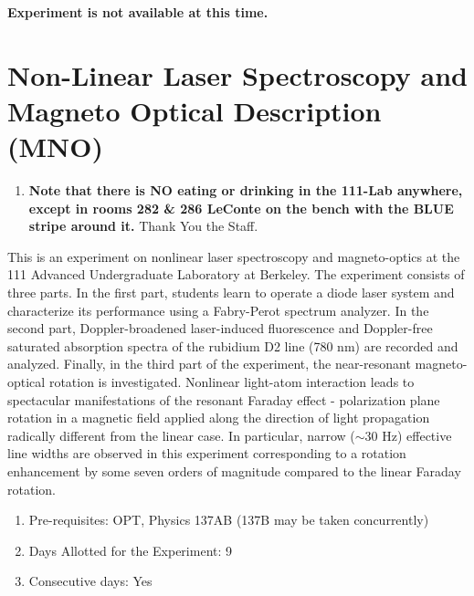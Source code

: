 \documentclass{../lab}
\begin{document}
\maketitle

\vspace{3cm}
\centerline{\Huge \bf Experiment is not available at this time.}

\newpage


\tableofcontents

\section{Non-Linear Laser Spectroscopy and Magneto Optical Description (MNO)}

\begin{enumerate}
    \item \textbf{Note that there is NO eating or drinking in the 111-Lab anywhere, except in rooms 282 \& 286 LeConte on the bench with the BLUE stripe around it.} Thank You the Staff.

\end{enumerate}

\newpage

This is an experiment on nonlinear laser spectroscopy and magneto-optics at the 111 Advanced Undergraduate Laboratory at Berkeley. The experiment consists of three parts. In the first part, students learn to operate a diode laser system and characterize its performance using a Fabry-Perot spectrum analyzer. In the second part, Doppler-broadened laser-induced fluorescence and Doppler-free saturated absorption spectra of the rubidium D2 line (780 nm) are recorded and analyzed. Finally, in the third part of the experiment, the near-resonant magneto-optical rotation is investigated. Nonlinear light-atom interaction leads to spectacular manifestations of the resonant Faraday effect - polarization plane rotation in a magnetic field applied along the direction of light propagation radically different from the linear case. In particular, narrow ($\sim$30 Hz) effective line widths are observed in this experiment corresponding to a rotation enhancement by some seven orders of magnitude compared to the linear Faraday rotation.

\begin{enumerate}
    \item Pre-requisites: OPT, Physics 137AB (137B may be taken concurrently)

    \item Days Allotted for the Experiment: 9

    \item Consecutive days: Yes

\end{enumerate}
\end{document}

